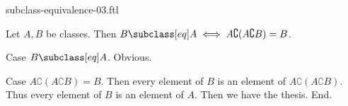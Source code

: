 \documentclass{article}
\begin{document}
\begin{smodule}[creators={Marcel Schütz}]{subclass-equivalence-03.ftl}

  \begin{fproposition*}[label=1566063126904832]
    Let $A, B$ be classes.
    Then $B \subclass[eq] A \iff A \complement (A \complement B) = B$.
  \end{fproposition*}
  \begin{fproof}
    Case $B \subclass[eq] A$. Obvious.

    Case $A \complement (A \complement B) = B$.
      Then every element of $B$ is an element of $A \complement
      (A \complement B)$.
      Thus every element of $B$ is an element of $A$.
      Then we have the thesis.
    End.
  \end{fproof}
\end{smodule}
\end{document}
